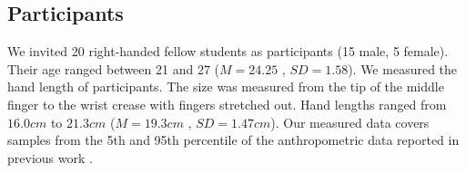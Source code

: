 \subsection{Participants}
We invited 20 right-handed fellow students as participants (15 male, 5 female).
Their age ranged between 21 and 27 ($ M=24.25$ , $SD=1.58 $). 
We measured the hand length of participants. 
The size was measured from the tip of the middle finger to the wrist crease with fingers stretched out.
Hand lengths ranged from $16.0cm$ to $21.3cm$ ($M=19.3cm$ , $SD=1.47cm$).
Our measured data covers samples from the 5th and 95th percentile of the anthropometric data reported in previous work \cite{Poston}.  
